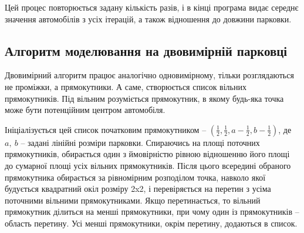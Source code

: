 Цей процес повторюється задану кількість разів, і в кінці програма видає середнє значення автомобілів з усіх ітерацій, а також відношення до довжини парковки.

\subsection{Алгоритм моделювання на двовимірній парковці}

Двовимірний алгоритм працює аналогічно одновимірному, тільки розглядаються не проміжки, а прямокутники. А саме, створюється список вільних прямокутників. Під вільним розуміється прямокутник, в якому будь-яка точка може бути потенційним центром автомобіля.

Ініціалізується цей список початковим прямокутником – $(\frac{1}{2}, \frac{1}{2}, a - \frac{1}{2}, b - \frac{1}{2})$, де $a,~b$ – задані лінійні розміри парковки. Спираючись на площі поточних прямокутників, обирається один з ймовірністю рівною відношенню його площі до сумарної площі усіх вільних прямокутників. Після цього всередині обраного прямокутника обирається за рівномірним розподілом точка, навколо якої будується квадратний окіл розміру 2x2, і перевіряється на перетин з усіма поточними вільними прямокутниками. Якщо перетинається, то вільний прямокутник ділиться на менші прямокутники, при чому один із прямокутників – область перетину. Усі менші прямокутники, окрім перетину, додаються в список.
